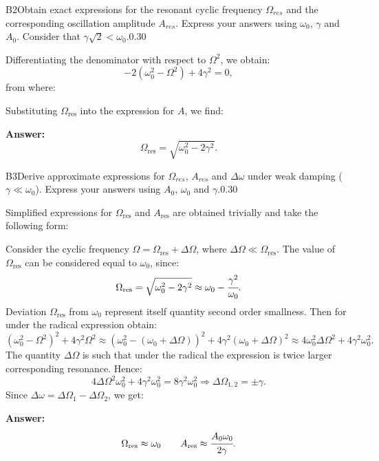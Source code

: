\documentclass[11pt,a4paper]{article}
\begin{document}
\begin{solcard}{B2}{Obtain exact expressions for the resonant cyclic frequency $\Omega_{res}$ and the corresponding oscillation amplitude $A_{res}$. Express your answers using $\omega_0$, $\gamma$ and $A_0$. Consider that $\gamma\sqrt{2}<\omega_0$.}{0.30}

Differentiating the denominator with respect to $\Omega^2$, we obtain: $$-2(\omega^2_0-\Omega^2)+4\gamma^2=0{,} $$from where:


Substituting $\Omega_\text{res}$ into the expression for $A$, we find:

\par\smallskip\noindent\textbf{Answer:} $$\Omega_\text{res}=\sqrt{\omega^2_0-2\gamma^2}{.} $$
\end{solcard}

\begin{solcard}{B3}{Derive approximate expressions for $\Omega_{res}$, $A_{res}$ and $\Delta{\omega}$ under weak damping ($\gamma\ll{\omega_0}$). Express your answers using $A_0$, $\omega_0$ and $\gamma$.}{0.30}

Simplified expressions for $\Omega_\text{res}$ and $A_\text{res}$ are obtained trivially and take the following form:


Consider the cyclic frequency $\Omega=\Omega_\text{res}+\Delta\Omega$, where $\Delta\Omega\ll\Omega_\text{res}$. The value of $\Omega_\text{res}$ can be considered equal to $\omega_0$, since: $$\Omega_\text{res}=\sqrt{\omega^2_0-2\gamma^2}\approx \omega_0-\cfrac{\gamma^2}{\omega_0}{.} $$Deviation $\Omega_\text{res}$ from $\omega_0$ represent itself quantity second order smallness. Then for under the radical expression obtain: $$\left(\omega^2_0-\Omega^2\right)^2+4\gamma^2\Omega^2\approx \left(\omega^2_0-\left(\omega_0+\Delta\Omega\right)\right)^2+4\gamma^2\left(\omega_0+\Delta\Omega\right)^2\approx 4\omega^2_0\Delta\Omega^2+4\gamma^2\omega^2_0{.} $$The quantity $\Delta\Omega$ is such that under the radical the expression is twice larger corresponding resonance. Hence: $$4\Delta{\Omega}^2\omega^2_0+4\gamma^2\omega^2_0=8\gamma^2\omega^2_0\Rightarrow \Delta{\Omega}_{1{,}2}=\pm\gamma{.} $$Since $\Delta\omega=\Delta\Omega_1-\Delta\Omega_2$, we get:

\par\smallskip\noindent\textbf{Answer:} $$\Omega_\text{res}\approx{\omega_0}\qquad A_\text{res}\approx{\cfrac{A_0\omega_0}{2\gamma}}{.} $$
\end{solcard}
\end{document}
